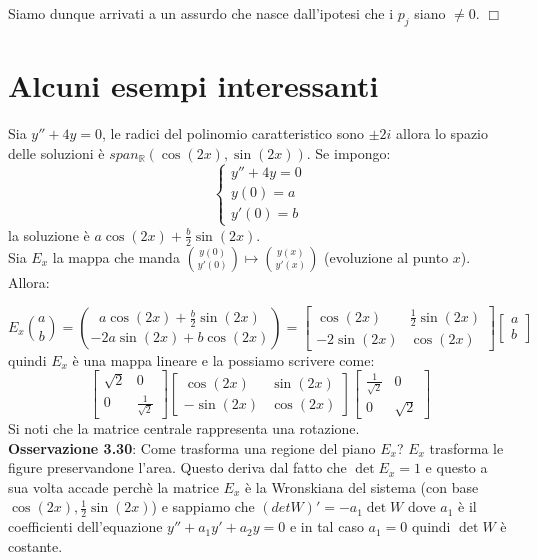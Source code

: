 \documentclass[a4paper,11pt,titlepage]{book}
\begin{document}
Siamo dunque arrivati a un assurdo che nasce dall'ipotesi che i $p_j$ siano $\ne 0$. $\Box$

\section{Alcuni esempi interessanti}

Sia $y''+4y=0$, le radici del polinomio caratteristico sono $\pm 2i$ allora lo spazio delle soluzioni è $span_\mathbb{R}(\cos(2x),\sin(2x))$. Se impongo:
$$\begin{cases}
y''+4y=0\\
y(0)=a\\
y'(0)=b \end{cases}$$
la soluzione è $a\cos(2x)+\frac{b}{2}\sin(2x)$.\\

Sia $E_x$ la mappa che manda $\binom{y(0)}{y'(0)}\mapsto\binom{y(x)}{y'(x)}$ (evoluzione al punto $x$). Allora:

$$E_x\binom{a}{b}=\binom{a\cos(2x)+\frac{b}{2}\sin(2x)}{-2a\sin(2x)+b\cos(2x)}=\begin{bmatrix} \cos(2x) & \frac{1}{2}\sin(2x) \\ -2\sin(2x) &  \cos(2x) \end{bmatrix}\begin{bmatrix}
a \\ b
\end{bmatrix}$$
quindi $E_x$ è una mappa lineare e la possiamo scrivere come:
$$\begin{bmatrix}
\sqrt{2} & 0\\
0 & \frac{1}{\sqrt{2}}
\end{bmatrix}
\begin{bmatrix}
\cos(2x) & \sin(2x) \\
-\sin(2x) & \cos(2x)
\end{bmatrix}
\begin{bmatrix}
\frac{1}{\sqrt{2}} & 0\\
0 & \sqrt{2}
\end{bmatrix}$$
Si noti che la matrice centrale rappresenta una rotazione.\\

\textbf{Osservazione 3.30}: Come trasforma una regione del piano $E_x$? $E_x$ trasforma le figure preservandone l'area. Questo deriva dal fatto che $\det E_x=1$ e questo a sua volta accade perchè la matrice $E_x$ è la Wronskiana del sistema (con base $\cos(2x),\frac{1}{2}\sin(2x)$) e sappiamo che $(det W)'=-a_1\det W$ dove $a_1$ è il coefficienti dell'equazione $y''+a_1y'+a_2y=0$ e in tal caso $a_1=0$ quindi $\det W$ è costante.\\
\end{document}
